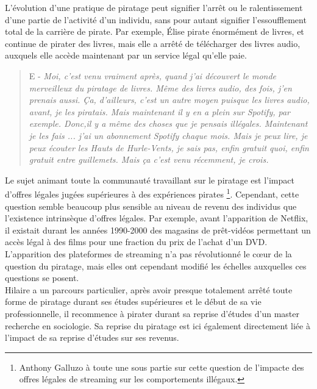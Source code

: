 L'évolution d'une pratique de piratage peut signifier l'arrêt ou le ralentissement d'une partie de l'activité d'un individu, sans pour autant signifier l'essoufflement total de la carrière de pirate. Par exemple, Élise pirate énormément de livres, et continue de pirater des livres, mais elle a arrêté de télécharger des livres audio, auxquels elle accède maintenant par un service légal qu'elle paie. 

\begin{quote}
    E - \textit{Moi, c'est venu vraiment après, quand j'ai découvert le monde merveilleux du piratage de livres. Même des livres audio, des fois, j'en prenais aussi. Ça, d'ailleurs, c'est un autre moyen puisque les livres audio, avant, je les piratais. Mais maintenant il y en a plein sur Spotify, par exemple. Donc,il y a même des choses que je pensais illégales. Maintenant je les fais ... j'ai un abonnement Spotify chaque mois. Mais je peux lire, je peux écouter les Hauts de Hurle-Vents, je sais pas, enfin gratuit quoi, enfin \og gratuit \fg entre guillemets. Mais ça c'est venu récemment, je crois.}
\end{quote}

Le sujet animant toute la communauté travaillant sur le piratage est l'impact d'offres légales jugées supérieures à des expériences pirates \footnote{Anthony Galluzo à toute une sous partie sur cette question de l'impacte des offres légales de streaming sur les comportements illégaux.}. Cependant, cette question semble beaucoup plus sensible au niveau de revenu des individus que l'existence intrinsèque d'offres légales. Par exemple, avant l'apparition de Netflix, il existait durant les années 1990-2000 des magasins de prêt-vidéos permettant un accès légal à des films pour une fraction du prix de l'achat d'un DVD. L'apparition des plateformes de streaming n'a pas révolutionné le cœur de la question du piratage, mais elles ont cependant modifié les échelles auxquelles ces questions se posent. \\

Hilaire a un parcours particulier, après avoir presque totalement arrêté toute forme de piratage durant ses études supérieures et le début de sa vie professionnelle, il recommence à pirater durant sa reprise d'études d'un master recherche en sociologie. Sa reprise du piratage est ici également directement liée à l'impact de sa reprise d'études sur ses revenus. 

